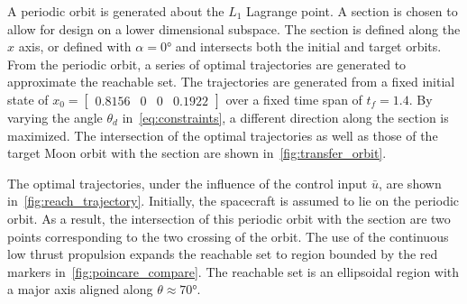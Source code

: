 \documentclass[preprint]{elsarticle}
\begin{document}
A periodic orbit is generated about the \( L_1 \) Lagrange point. 
A \Poincare section is chosen to allow for design on a lower dimensional subspace.
The section is defined along the \( \hat{x} \) axis, or defined with \( \alpha = \ang{0} \) and intersects both the initial and target orbits.
From the periodic orbit, a series of optimal trajectories are generated to approximate the reachable set.
The trajectories are generated from a fixed initial state of \( x_0 = \begin{bmatrix}0.8156 & 0 & 0 & 0.1922 \end{bmatrix} \) over a fixed time span of \( t_f = 1.4 \).
By varying the angle \( \theta_d\) in~\cref{eq:constraints}, a different direction along the \Poincare section is maximized. 
The intersection of the optimal trajectories as well as those of the target Moon orbit with the \Poincare section are shown in~\cref{fig:transfer_orbit}.

The optimal trajectories, under the influence of the control input \( \bar{u} \), are shown in~\cref{fig:reach_trajectory}.
Initially, the spacecraft is assumed to lie on the periodic orbit.
As a result, the intersection of this periodic orbit with the \Poincare section are two points corresponding to the two crossing of the orbit.
The use of the continuous low thrust propulsion expands the reachable set to region bounded by the red markers in~\cref{fig:poincare_compare}.
The reachable set is an ellipsoidal region with a major axis aligned along \( \theta \approx \ang{70} \).
\end{document}
